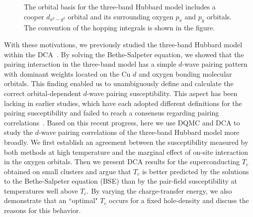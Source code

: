 \documentclass[reprint,nofootinbib,nobibnotes,amsmath,amssymb,aps,prb,floatfix]{revtex4-2}
\begin{document}
\begin{figure}[b]
\caption{ The orbital basis for the three-band Hubbard model includes a cooper $d_{x^2-y^2}$ orbital and its surrounding oxygen $p_x$ and $p_y$ orbitals. The convention of the hopping integrals is shown in the figure.
}
\label{threeband}
\end{figure}

With these motivations, we previously studied the three-band Hubbard model within the DCA~\cite{Mai}. By solving the Bethe-Salpeter equation, we showed that the pairing interaction in the three-band model has a simple $d$-wave pairing pattern with dominant weights located on the Cu $d$ and oxygen bonding molecular orbitals. This finding enabled us to unambiguously define and calculate the correct orbital-dependent $d$-wave pairing susceptibility. This aspect has been lacking in earlier studies, which have each adopted different definitions for the pairing susceptibility and failed to reach a consensus regarding pairing correlations~\cite{Scalettar, Guerrero,  Moreo, Biborski}. Based on this recent progress, here we use DQMC and DCA to study the $d$-wave pairing correlations of the three-band Hubbard model more broadly. We first establish an agreement between the susceptibility measured by both methods at high temperature and the marginal effect of on-site interaction in the oxygen orbitals. Then we present DCA results for the superconducting $T_c$ obtained on small clusters and argue that $T_c$ is better predicted by the solutions to the Bethe-Salpeter equation (BSE) than by the pair-field susceptibility at temperatures well above $T_c$. By varying the charge-transfer energy, we also demonstrate that an ``optimal" $T_c$ occurs for a fixed hole-density and discuss the reasons for this behavior. 
\end{document}
